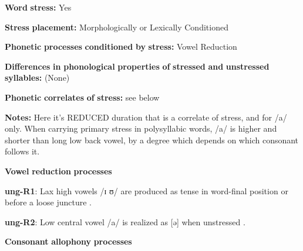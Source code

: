 \documentclass[output=paper]{langsci/langscibook}
\begin{document}
\begin{styleBody}
\textbf{Word} \textbf{stress:} Yes
\end{styleBody}

\begin{styleBody}
\textbf{Stress} \textbf{placement:} Morphologically or Lexically Conditioned
\end{styleBody}

\begin{styleBody}
\textbf{Phonetic} \textbf{processes} \textbf{conditioned} \textbf{by} \textbf{stress:} Vowel Reduction
\end{styleBody}

\begin{styleBody}
\textbf{Differences} \textbf{in} \textbf{phonological} \textbf{properties} \textbf{of} \textbf{stressed} \textbf{and} \textbf{unstressed} \textbf{syllables:} (None)
\end{styleBody}

\begin{styleBody}
\textbf{Phonetic} \textbf{correlates} \textbf{of} \textbf{stress:} see below
\end{styleBody}

\begin{styleBody}
\textbf{Notes:} Here it’s REDUCED duration that is a correlate of stress, and for /a/ only. When carrying primary stress in polysyllabic words, /a/ is higher and shorter than long low back vowel, by a degree which depends on which consonant follows it.
\end{styleBody}

\begin{styleBody}
\textbf{Vowel} \textbf{reduction} \textbf{processes}
\end{styleBody}

\begin{styleBody}
\textbf{ung-R1}: Lax high vowels /ɪ ʊ/ are produced as tense in word-final position or before a loose juncture \citep[13-16]{Rumsey1978}.
\end{styleBody}

\begin{styleBody}
\textbf{ung-R2}: Low central vowel /a/ is realized as [ə] when unstressed \citep[17-18]{Rumsey1978}.
\end{styleBody}

\begin{styleBody}
\textbf{Consonant} \textbf{allophony} \textbf{processes}
\end{styleBody}
\end{document}
